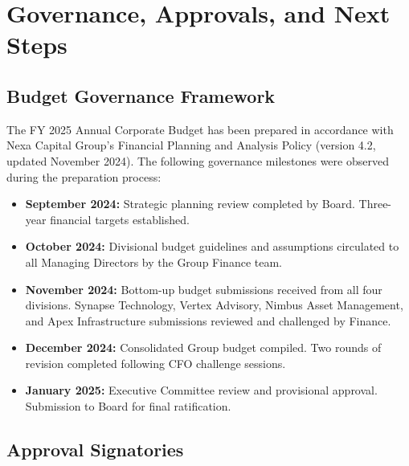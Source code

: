
\section{Governance, Approvals, and Next Steps}

\subsection{Budget Governance Framework}

The FY 2025 Annual Corporate Budget has been prepared in accordance with Nexa Capital
Group's Financial Planning and Analysis Policy (version 4.2, updated November 2024).
The following governance milestones were observed during the preparation process:

\begin{itemize}
  \item \textbf{September 2024:} Strategic planning review completed by Board.
        Three-year financial targets established.
  \item \textbf{October 2024:} Divisional budget guidelines and assumptions
        circulated to all Managing Directors by the Group Finance team.
  \item \textbf{November 2024:} Bottom-up budget submissions received from all four
        divisions. Synapse Technology, Vertex Advisory, Nimbus Asset Management,
        and Apex Infrastructure submissions reviewed and challenged by Finance.
  \item \textbf{December 2024:} Consolidated Group budget compiled. Two rounds of
        revision completed following CFO challenge sessions.
  \item \textbf{January 2025:} Executive Committee review and provisional approval.
        Submission to Board for final ratification.
\end{itemize}

\subsection{Approval Signatories}

